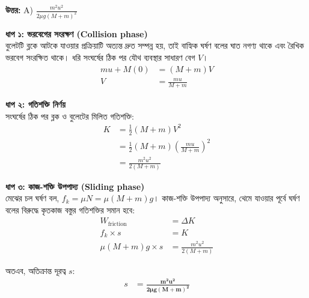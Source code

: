 \documentclass[12pt, a4paper]{article}
\begin{document}
\vspace{0.5em}
\begin{tcolorbox}[answerbox]
    \textbf{\color{success} উত্তর:} A)  $\frac{m^2 u^2}{2\mu g (M + m)^2}$
\end{tcolorbox}
\vspace{1em}

\begin{tcolorbox}[solutionbox={সমাধান (Solution)}]
    \noindent
    \textbf{ধাপ ১: ভরবেগের সংরক্ষণ (Collision phase)} \\
    বুলেটটি ব্লকে আটকে যাওয়ার প্রক্রিয়াটি অত্যন্ত দ্রুত সম্পন্ন হয়, তাই বাহ্যিক ঘর্ষণ বলের ঘাত নগণ্য থাকে এবং রৈখিক ভরবেগ সংরক্ষিত থাকে। ধরি সংঘর্ষের ঠিক পর যৌথ ব্যবস্থার সাধারণ বেগ $V$।
    \begin{align*}
        m u + M (0) &= (M + m) V \\
        V &= \frac{m u}{M + m}
    \end{align*}
    
    \vspace{0.5em}
    \noindent\textbf{ধাপ ২: গতিশক্তি নির্ণয়} \\
    সংঘর্ষের ঠিক পর ব্লক ও বুলেটের মিলিত গতিশক্তি:
    \begin{align*}
        K &= \frac{1}{2} (M + m) V^2 \\
          &= \frac{1}{2} (M + m) \left(\frac{m u}{M + m}\right)^2 \\
          &= \frac{m^2 u^2}{2 (M + m)}
    \end{align*}
    
    \vspace{0.5em}
    \noindent\textbf{ধাপ ৩: কাজ-শক্তি উপপাদ্য (Sliding phase)} \\
    মেঝের চল ঘর্ষণ বল, $f_k = \mu N = \mu (M + m) g$। 
    কাজ-শক্তি উপপাদ্য অনুসারে, থেমে যাওয়ার পূর্বে ঘর্ষণ বলের বিরুদ্ধে কৃতকাজ বস্তুর গতিশক্তির সমান হবে:
    \begin{align*}
        W_{\text{friction}} &= \Delta K \\
        f_k \times s &= K \\
        \mu (M + m) g \times s &= \frac{m^2 u^2}{2 (M + m)}
    \end{align*}
    
    অতএব, অতিক্রান্ত দূরত্ব $s$:
    \begin{align*}
        s &= \mathbf{\frac{m^2 u^2}{2\mu g (M + m)^2}}
    \end{align*}
\end{tcolorbox}
\end{document}
